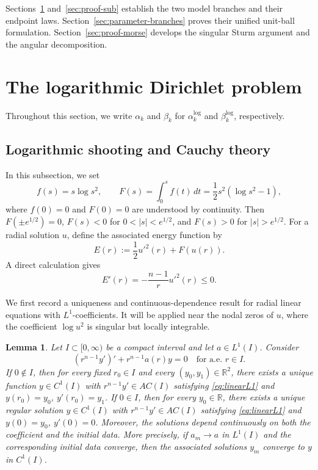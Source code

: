 \documentclass[11pt]{article}
\newtheorem{lemma}[theorem]{Lemma}
\begin{document}
Sections~\ref{sec:proof-log} and~\ref{sec:proof-sub} establish the two model
branches and their endpoint laws. Section~\ref{sec:parameter-branches}
proves their unified unit-ball formulation. Section~\ref{sec:proof-morse}
develops the singular Sturm argument and the angular decomposition.

\section{The logarithmic Dirichlet problem}
\label{sec:proof-log}

Throughout this section, we write $\alpha_k$ and $\beta_k$ for $\alpha_k^{\log}$ and $\beta_k^{\log}$, respectively.


\subsection{Logarithmic shooting and Cauchy theory}
{In this subsection, we set}
\begin{equation*}
 f(s)=s\log s^2,
 \qquad
 F(s)=\int_0^s f(t)\,dt=\frac12s^2(\log s^2-1),
\end{equation*}
where $f(0)=0$ and $F(0)=0$ are understood by continuity.
Then {$F(\pm e^{1/2})=0$}, $F(s)<0$ for $0<|s|<e^{1/2}$, and $F(s)>0$ for $|s|>e^{1/2}$.
For a radial solution $u$, define the associated energy function by
\begin{equation}\label{eq:energy}
 E(r):=\frac12 u'^2(r)+F(u(r)).
\end{equation}
A direct calculation gives
\begin{equation}\label{eq:Eprime}
 E'(r)=-\frac{n-1}{r}u'^2(r)\leq0.
\end{equation}

We first record a uniqueness and continuous-dependence result for radial linear equations with $L^1$-coefficients. It will be applied near the nodal zeros of $u$, where the coefficient $\log u^2$ is singular but locally integrable.

\begin{lemma}\label{lem:log-L1}
Let $I\subset[0,\infty)$ be a compact interval and let $a\in L^1(I)$. Consider
\begin{equation}\label{eq:linearL1}
 (r^{n-1}y')'+r^{n-1}a(r)y=0\quad{\text{for a.e. }r\in I}.
\end{equation}
If $0\notin I$, then for every fixed $r_0\in I$ and every $(y_0,y_1)\in \mathbb R^2$, there exists a unique function $y\in C^1(I)$ with $r^{n-1}y'\in AC(I)$ satisfying \eqref{eq:linearL1} and $y(r_0)=y_0$, $y'(r_0)=y_1$. If $0\in I$, then for every $y_0\in \mathbb R$, {there exists a unique regular solution} $y\in C^1(I)$ with $r^{n-1}y'\in AC(I)$ satisfying \eqref{eq:linearL1} and $y(0)=y_0$, $y'(0)=0$. Moreover, the solutions depend continuously on both the coefficient and the initial data. More precisely, if $a_m\to a$ in $L^1(I)$ and the corresponding initial data converge, then the associated solutions $y_m$ converge to $y$ in $C^1(I)$.
\end{lemma}
\end{document}
